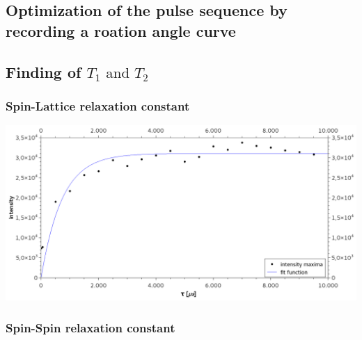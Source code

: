     \subsection{Optimization of the pulse sequence by recording a roation angle curve}
    \label{task_3}
    
    \subsection{Finding of $T_1 \text{ and } T_2$}
    \subsubsection{Spin-Lattice relaxation constant}
    \begin{center}
        \minipanf
            \includegraphics[scale=0.3]{pic/T1.png}
        \minipend
    \end{center}
    \subsubsection{Spin-Spin relaxation constant}
    
    \label{task_4}